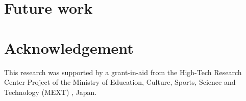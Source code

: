 \documentclass[8pt,twocolumn]{article}
\begin{document}
\section{Future work}

\section*{Acknowledgement}
This research was supported by a grant-in-aid from the High-Tech Research
Center Project of the Ministry of Education, Culture, Sports, Science and
Technology (MEXT) \cite{mext:2014:Online}, Japan.



\end{document}
